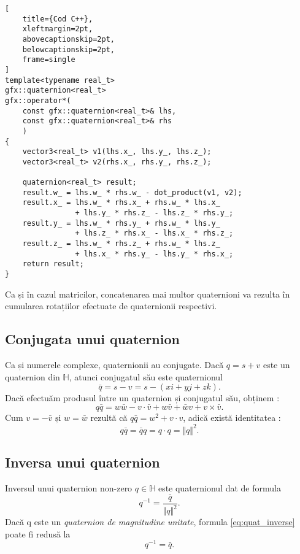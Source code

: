 \begin{lstlisting}[
    title={Cod C++}, 
    xleftmargin=2pt,
    abovecaptionskip=2pt,
    belowcaptionskip=2pt,
    frame=single
]
template<typename real_t>
gfx::quaternion<real_t>
gfx::operator*(
    const gfx::quaternion<real_t>& lhs, 
    const gfx::quaternion<real_t>& rhs
    )
{
    vector3<real_t> v1(lhs.x_, lhs.y_, lhs.z_);
    vector3<real_t> v2(rhs.x_, rhs.y_, rhs.z_);

    quaternion<real_t> result;
    result.w_ = lhs.w_ * rhs.w_ - dot_product(v1, v2);
    result.x_ = lhs.w_ * rhs.x_ + rhs.w_ * lhs.x_ 
                + lhs.y_ * rhs.z_ - lhs.z_ * rhs.y_;
    result.y_ = lhs.w_ * rhs.y_ + rhs.w_ * lhs.y_ 
                + lhs.z_ * rhs.x_ - lhs.x_ * rhs.z_;
    result.z_ = lhs.w_ * rhs.z_ + rhs.w_ * lhs.z_ 
                + lhs.x_ * rhs.y_ - lhs.y_ * rhs.x_;
    return result;
}
\end{lstlisting}
Ca și în cazul matricilor, concatenarea mai multor quaternioni va rezulta în 
cumularea rotațiilor efectuate de quaternionii respectivi.

\subsection{Conjugata unui quaternion}
\label{ch1:quaternions:conjugate}
Ca și numerele complexe, quaternionii au conjugate.
Dacă $q = s + v$ este un quaternion din $\mathbb{H}$, atunci conjugatul său este
quaternionul
\begin{equation}
\bar{q} = s - v = s - (x\mathit{i} + y\mathit{j} + z\mathit{k}).
\end{equation}
Dacă efectuăm produsul între un quaternion și conjugatul său, obținem :
\[
q\bar{q} = w\bar{w} - v \cdot \bar{v} + w\bar{v} + \bar{w}v + v \times \bar{v}.
\]
Cum $v = -\bar{v} \text{ și } w = \bar{w}$ rezultă că $q\bar{q} = w^2 +
v\cdot v$, adică există identitatea : 
\begin{equation}
q\bar{q} = \bar{q}q = q \cdot q = \Vert q \Vert ^ 2.
\end{equation}

\subsection{Inversa unui quaternion}
\label{ch1:quaternions:inverse}
Inversul unui quaternion non-zero $q \in \mathbb{H}$ este quaternionul dat de 
formula
\begin{equation}
\label{eq:quat_inverse}
q^{-1} = \frac{\bar{q}}{\Vert q \Vert ^ 2}.
\end{equation}
Dacă q este un \textit{quaternion de magnitudine unitate}, formula
\eqref{eq:quat_inverse} poate fi redusă la
\begin{equation}
q^{-1} = \bar{q}.
\end{equation}


